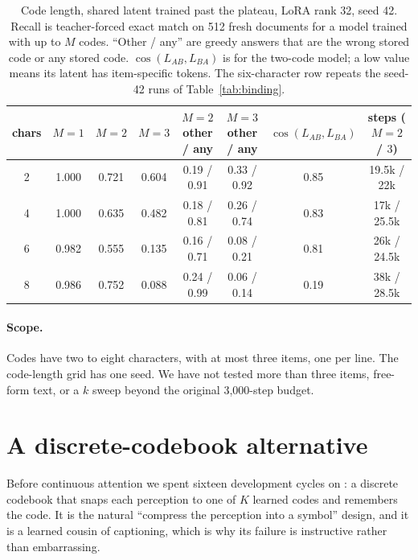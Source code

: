\begin{table}[h]
\small\centering
\caption{Code length, shared latent trained past the plateau, LoRA rank 32, seed 42. Recall is teacher-forced exact match on 512 fresh documents for a model trained with up to $M$ codes. ``Other / any'' are greedy answers that are the wrong stored code or any stored code. $\cos(L_{AB},L_{BA})$ is for the two-code model; a low value means its latent has item-specific tokens. The six-character row repeats the seed-42 runs of Table~\ref{tab:binding}.}
\label{tab:codelen}
\setlength{\tabcolsep}{4pt}
\begin{tabular}{@{}cccccccc@{}}
\toprule
\textbf{chars} & $M{=}1$ & $M{=}2$ & $M{=}3$ & \textbf{$M{=}2$ other / any} & \textbf{$M{=}3$ other / any} & $\cos(L_{AB},L_{BA})$ & \textbf{steps ($M{=}2$ / $3$)} \\
\midrule
2 & 1.000 & 0.721 & 0.604 & 0.19 / 0.91 & 0.33 / 0.92 & 0.85 & 19.5k / 22k \\
4 & 1.000 & 0.635 & 0.482 & 0.18 / 0.81 & 0.26 / 0.74 & 0.83 & 17k / 25.5k \\
6 & 0.982 & 0.555 & 0.135 & 0.16 / 0.71 & 0.08 / 0.21 & 0.81 & 26k / 24.5k \\
8 & 0.986 & 0.752 & 0.088 & 0.24 / 0.99 & 0.06 / 0.14 & 0.19 & 38k / 28.5k \\
\bottomrule
\end{tabular}
\end{table}

\paragraph{Scope.} Codes have two to eight characters, with at most three items, one per line. The code-length grid has one seed. We have not tested more than three items, free-form text, or a $k$ sweep beyond the original 3{,}000-step budget.

\section{A discrete-codebook alternative}
\label{app:patha}

Before continuous attention we spent sixteen development cycles on \patha{}: a discrete codebook that snaps each perception to one of $K$ learned codes and remembers the code. It is the natural ``compress the perception into a symbol'' design, and it is a learned cousin of captioning, which is why its failure is instructive rather than embarrassing.

